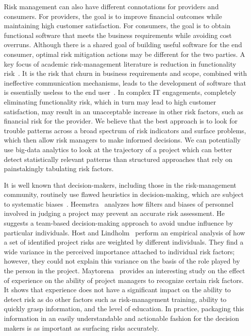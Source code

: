 Risk management can also have different connotations for provi\-ders and
consumers. For providers, the goal is to improve financial outcomes while
maintaining high customer satisfaction. For consumers, the goal is to obtain
functional software that meets the business requirements while avoiding cost
overruns. Although there is a shared goal of building useful software for the
end consumer, optimal risk mitigation actions may be different for the two
parties. A key focus of academic risk-management literature is reduction in
functionality risk~\cite{risk11}.  It is the risk that churn in business
requirements and scope, combined with ineffective communication mechanisms,
leads to the development of software that is essentially useless to the end
user~\cite{risk12}. In complex IT engagements, completely eliminating
functionality risk, which in turn may lead to high customer satisfaction, may
result in an unacceptable increase in other risk factors, such as financial risk
for the provider. We believe that the best approach is to look for trouble
patterns across a broad spectrum of risk indicators and surface problems, which
then allow risk managers to make informed decisions. We can potentially use
big-data analytics to look at the trajectory of a project which can better
detect statistically relevant patterns than structured approaches that rely on
painstakingly tabulating risk factors.

It is well known that decision-makers, including those in the risk-management
community, routinely use flawed heuristics in decision-making, which are subject
to systematic biases~\cite{risk27}. Heemstra~\cite{risk24} analyzes how filters
and biases of personnel involved in judging a project may prevent an accurate
risk assessment. He suggests a team-based decision-making approach to avoid
undue influence by particular individuals. Host and Lindholm~\cite{risk25}
perform an empirical analysis of how a set of identified project risks are
weighted by different individuals. They find a wide variance in the perceived
importance attached to individual risk factors; however, they could not explain
this variance on the basis of the role played by the person in the
project. Maytorena~\cite{risk26} provides an interesting study on the effect of
experience on the ability of project managers to recognize certain risk
factors. It shows that experience does not have a significant impact on the
ability to detect risk as do other factors such as risk-management training,
ability to quickly grasp information, and the level of education. In practice,
packaging this information in an easily understandable and actionable fashion
for the decision makers is as important as surfacing risks accurately.

